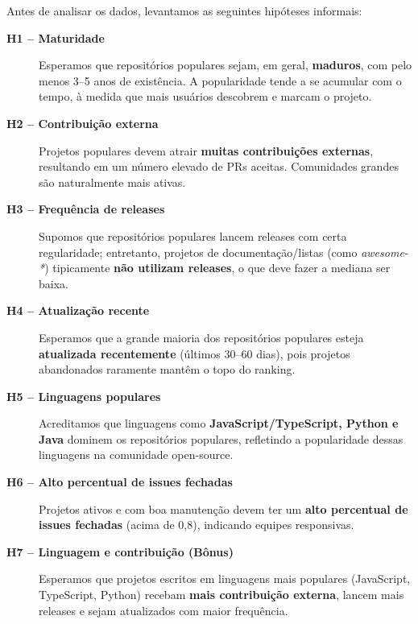 \documentclass[10pt,a4paper,twocolumn]{article}
\begin{document}
Antes de analisar os dados, levantamos as seguintes hipóteses informais:

\begin{description}
  \item[\textbf{H1 -- Maturidade}]
    Esperamos que repositórios populares sejam, em geral, \textbf{maduros},
    com pelo menos 3--5 anos de existência. A popularidade tende a se acumular
    com o tempo, à medida que mais usuários descobrem e marcam o projeto.

  \item[\textbf{H2 -- Contribuição externa}]
    Projetos populares devem atrair \textbf{muitas contribuições externas},
    resultando em um número elevado de PRs aceitas. Comunidades grandes são
    naturalmente mais ativas.

  \item[\textbf{H3 -- Frequência de releases}]
    Supomos que repositórios populares lancem releases com certa regularidade;
    entretanto, projetos de documentação/listas (como \textit{awesome-*})
    tipicamente \textbf{não utilizam releases}, o que deve fazer a mediana ser
    baixa.

  \item[\textbf{H4 -- Atualização recente}]
    Esperamos que a grande maioria dos repositórios populares esteja
    \textbf{atualizada recentemente} (últimos 30--60 dias), pois projetos
    abandonados raramente mantêm o topo do ranking.

  \item[\textbf{H5 -- Linguagens populares}]
    Acreditamos que linguagens como \textbf{JavaScript/TypeScript, Python e Java}
    dominem os repositórios populares, refletindo a popularidade dessas
    linguagens na comunidade open-source.

  \item[\textbf{H6 -- Alto percentual de issues fechadas}]
    Projetos ativos e com boa manutenção devem ter um \textbf{alto percentual
    de issues fechadas} (acima de 0,8), indicando equipes responsivas.

  \item[\textbf{H7 -- Linguagem e contribuição (Bônus)}]
    Esperamos que projetos escritos em linguagens mais populares
    (JavaScript, TypeScript, Python) recebam \textbf{mais contribuição externa},
    lancem mais releases e sejam atualizados com maior frequência.
\end{description}

\end{document}
